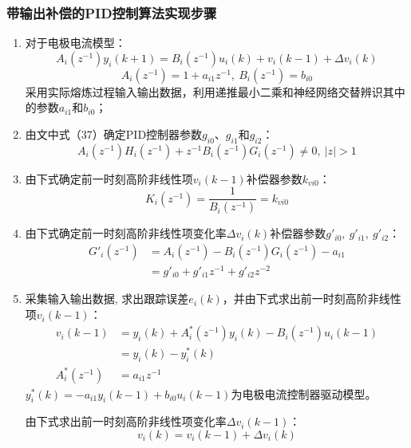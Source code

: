 \documentclass[UTF8, 12pt]{article}
\begin{document}
\subsubsection{带输出补偿的PID控制算法实现步骤}
\begin{enumerate}
	\item 对于电极电流模型：
	\begin{equation*}
		A_i(z^{-1})y_i(k+1) = B_i(z^{-1})u_i(k) + v_i(k-1) + \Delta v_i(k)
	\end{equation*}
	\begin{equation*}
		A_i(z^{-1}) = 1 + a_{i1}z^{-1},\ B_i(z^{-1}) = b_{i0}
	\end{equation*}
	采用实际熔炼过程输入输出数据，利用递推最小二乘和神经网络交替辨识其中的参数$a_{i1}$和$b_{i0}$；
	
	\item 由文中式（37）确定PID控制器参数$g_{i0}$、$g_{i1}$和$g_{i2}$：
	\begin{equation*}
		A_i(z^{-1})H_i(z^{-1}) + z^{-1}B_i(z^{-1})G_i(z^{-1}) \ne 0,\ |z| > 1
	\end{equation*}
	
	\item 由下式确定前一时刻高阶非线性项$v_i(k-1)$补偿器参数$k_{vi0}$：
	\begin{equation*}
		K_i(z^{-1}) = \frac{1}{B_i(z^{-1})} = k_{vi0}
	\end{equation*}

	\item  由下式确定前一时刻高阶非线性项变化率$\Delta v_i(k)$补偿器参数$g'_{i0},\ g'_{i1},\ g'_{i2}$：
	\begin{align*}
		G'_i(z^{-1}) &= A_i(z^{-1}) - B_i(z^{-1})G_i(z^{-1}) - a_{i1} \\
		&= g'_{i0} + g'_{i1}z^{-1} + g'_{i2}z^{-2}
	\end{align*}

	\item 采集输入输出数据, 求出跟踪误差$e_i(k)$，并由下式求出前一时刻高阶非线性项$v_i(k-1)$：
	\begin{align*}
		v_i(k-1) &= y_i(k) + A^*_i(z^{-1})y_i(k) - B_i(z^{-1})u_i(k-1) \\
		&= y_i(k) - y^*_i(k) \\
		A^*_i(z^{-1}) &= a_{i1}z^{-1}
	\end{align*}
	$y^*_i(k) = -a_{i1}y_i(k-1) + b_{i0}u_i(k-1)$为电极电流控制器驱动模型。

	由下式求出前一时刻高阶非线性项变化率$\Delta v_i(k-1)$：
	\begin{equation*}
		v_i(k) = v_i(k-1) + \Delta v_i(k)
	\end{equation*}


\end{enumerate}
\end{document}
